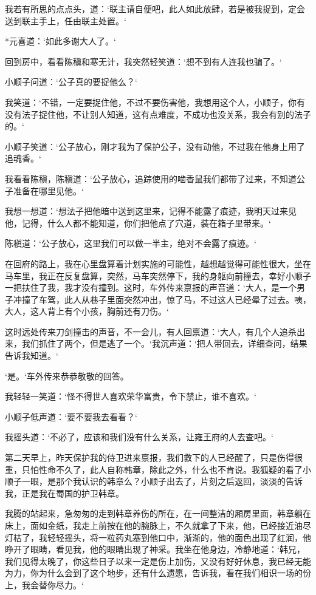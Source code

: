 我若有所思的点点头，道：‘联主请自便吧，此人如此放肆，若是被我捉到，定会送到联主手上，任由联主处置。‘

*元喜道：‘如此多谢大人了。‘

回到房中，看看陈稹和寒无计，我突然轻笑道：‘想不到有人连我也骗了。‘

小顺子问道：‘公子真的要捉他么？‘

我笑道：‘不错，一定要捉住他，不过不要伤害他，我想用这个人，小顺子，你有没有法子捉住他，不让别人知道，这有点难度，不成功也没关系，我会有别的法子的。‘

小顺子笑道：‘公子放心，刚才我为了保护公子，没有动他，不过我在他身上用了追魂香。‘

我看看陈稹，陈稹道：‘公子放心，追踪使用的啮香鼠我们都带了过来，不知道公子准备在哪里见他。‘

我想一想道：‘想法子把他暗中送到这里来，记得不能露了痕迹，我明天过来见他，记得，什么人都不能知道，你们把他点了穴道，装在箱子里带来。‘

陈稹道：‘公子放心，这里我们可以做一半主，绝对不会露了痕迹。‘

在回府的路上，我在心里盘算着计划实施的可能性，越想越觉得可能性很大，坐在马车里，我正在反复盘算，突然，马车突然停下，我的身躯向前撞去，幸好小顺子一把扶住了我，我才没有撞到。这时，车外传来禀报的声音道：‘大人，是一个男子冲撞了车驾，此人从巷子里面突然冲出，惊了马，不过这人已经晕了过去。咦，大人，这人背上有个小孩，胸前还有刀伤。‘

这时远处传来刀剑撞击的声音，不一会儿，有人回禀道：‘大人，有几个人追杀出来，我们抓住了两个，但是逃了一个。‘我沉声道：‘把人带回去，详细查问，结果告诉我知道。‘

‘是。‘车外传来恭恭敬敬的回答。

我轻轻一笑道：‘怪不得世人喜欢荣华富贵，令下禁止，谁不喜欢。‘

小顺子低声道：‘要不要我去看看？‘

我摇头道：‘不必了，应该和我们没有什么关系，让雍王府的人去查吧。‘

第二天早上，昨天保护我的侍卫进来禀报，我们救下的人已经醒了，只是伤得很重，只怕性命不久了，此人自称韩章，除此之外，什么也不肯说。我狐疑的看了小顺子一眼，是那个我认识的韩章么？小顺子出去了，片刻之后返回，淡淡的告诉我，正是我在蜀国的护卫韩章。

我腾的站起来，急匆匆的走到韩章养伤的所在，在一间整洁的厢房里面，韩章躺在床上，面如金纸，我走上前按在他的腕脉上，不久就拿了下来，他，已经接近油尽灯枯了，我轻轻摇头，将一粒药丸塞到他口中，渐渐的，他的面色出现了红润，他睁开了眼睛，看见我，他的眼睛出现了神采。我坐在他身边，冷静地道：‘韩兄，我们见得太晚了，你这些日子以来一定是伤上加伤，又没有好好休息，我已经无能为力，你为什么会到了这个地步，还有什么遗愿，告诉我，看在我们相识一场的份上，我会替你尽力。‘

